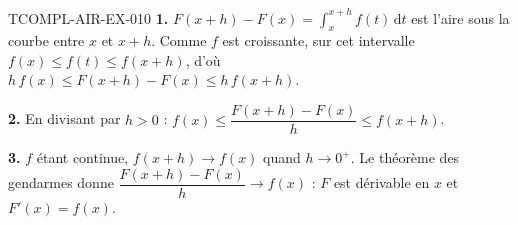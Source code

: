 \begin{corrige}{TCOMPL-AIR-EX-010}
\textbf{1.} $F(x+h)-F(x)=\int_x^{x+h}f(t)\,\mathrm{d}t$ est l'aire sous la
courbe entre $x$ et $x+h$. Comme $f$ est croissante, sur cet intervalle
$f(x)\leq f(t)\leq f(x+h)$, d'où
$h\,f(x)\leq F(x+h)-F(x)\leq h\,f(x+h)$.

\textbf{2.} En divisant par $h>0$ :
$f(x)\leq\dfrac{F(x+h)-F(x)}{h}\leq f(x+h)$.

\textbf{3.} $f$ étant continue, $f(x+h)\to f(x)$ quand $h\to0^+$. Le théorème
des gendarmes donne $\dfrac{F(x+h)-F(x)}{h}\to f(x)$ : $F$ est dérivable en
$x$ et $F'(x)=f(x)$.
\end{corrige}
